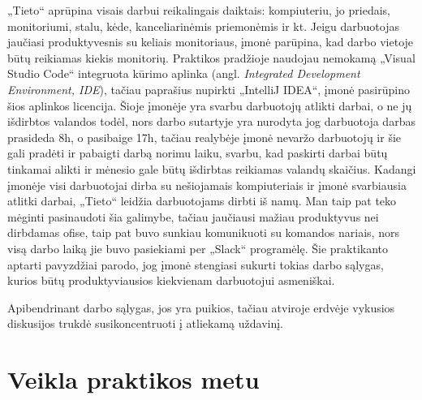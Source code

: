 \documentclass{VUMIFPSbakalaurinis}
\begin{document}
„Tieto“ aprūpina visais darbui reikalingais daiktais: kompiuteriu, jo priedais, monitoriumi, stalu, kėde, kanceliarinėmis priemonėmis ir kt. Jeigu darbuotojas jaučiasi produktyvesnis su keliais monitoriaus, įmonė parūpina, kad darbo vietoje būtų reikiamas kiekis monitorių. Praktikos pradžioje naudojau nemokamą „Visual Studio Code“ integruota kūrimo aplinka (angl. \textit{Integrated Development Environment, IDE}), tačiau paprašius nupirkti „IntelliJ IDEA“, įmonė pasirūpino šios aplinkos licencija. Šioje įmonėje yra svarbu darbuotojų atlikti darbai, o ne jų išdirbtos valandos todėl, nors darbo sutartyje yra nurodyta jog darbuotoja darbas prasideda 8h, o pasibaige 17h, tačiau realybėje įmonė nevaržo darbuotojų ir šie gali pradėti ir pabaigti darbą norimu laiku, svarbu, kad paskirti darbai būtų tinkamai alikti ir mėnesio gale būtų išdirbtas reikiamas valandų skaičius. Kadangi įmonėje visi darbuotojai dirba su nešiojamais kompiuteriais ir įmonė svarbiausia atlitki darbai, „Tieto“ leidžia darbuotojams dirbti iš namų. Man taip pat teko mėginti pasinaudoti šia galimybe, tačiau jaučiausi mažiau produktyvus nei dirbdamas ofise, taip pat buvo sunkiau komunikuoti su komandos nariais, nors visą darbo laiką jie buvo pasiekiami per „Slack“ programėlę. Šie praktikanto aptarti pavyzdžiai parodo, jog įmonė stengiasi sukurti tokias darbo sąlygas, kurios būtų produktyviausios kiekvienam darbuotojui asmeniškai. 

Apibendrinant darbo sąlygas, jos yra puikios, tačiau atviroje erdvėje vykusios diskusijos trukdė susikoncentruoti į atliekamą uždavinį.
\section{Veikla praktikos metu}
\end{document}
